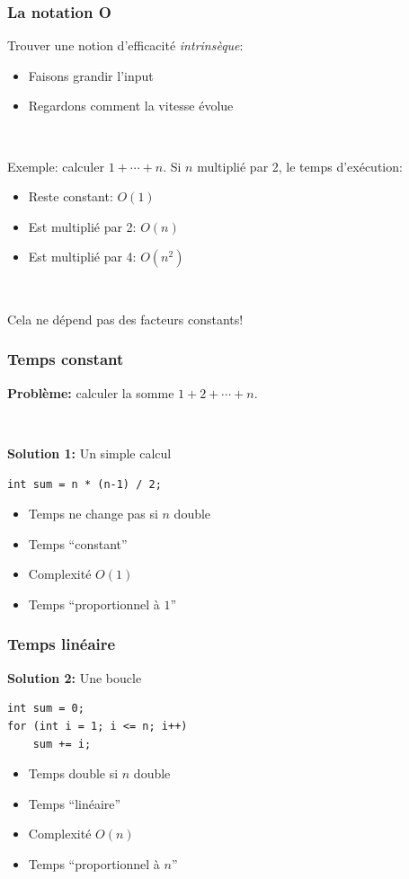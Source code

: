 \documentclass[12pt]{beamer}
\begin{document}
\begin{frame}
\frametitle{La notation O}
Trouver une notion d'efficacité \emph{intrinsèque}:
\begin{itemize}
\item Faisons grandir l'input
\item Regardons comment la vitesse évolue
\end{itemize}

~

Exemple: calculer $1+\cdots+n$. Si $n$ multiplié par 2, le temps d'exécution:
\begin{itemize}
\item Reste constant: $O(1)$
\item Est multiplié par 2: $O(n)$
\item Est multiplié par 4: $O(n^2)$
\end{itemize}

~

Cela ne dépend pas des facteurs constants!
\end{frame}

\begin{frame}[fragile]
\frametitle{Temps constant}
\textbf{Problème:} calculer la somme $1+2+\cdots+n$.

~

\textbf{Solution 1:} Un simple calcul
\begin{lstlisting}
int sum = n * (n-1) / 2;
\end{lstlisting}
\begin{itemize}
\item Temps ne change pas si $n$ double
\item Temps ``constant''
\item Complexité $O(1)$
\item Temps ``proportionnel à $1$''
\end{itemize}
\end{frame}

\begin{frame}[fragile]
\frametitle{Temps linéaire}
\textbf{Solution 2:} Une boucle
\begin{lstlisting}
int sum = 0;
for (int i = 1; i <= n; i++)
    sum += i;
\end{lstlisting}
\begin{itemize}
\item Temps double si $n$ double
\item Temps ``linéaire''
\item Complexité $O(n)$
\item Temps ``proportionnel à $n$''
\end{itemize}
\end{frame}
\end{document}
